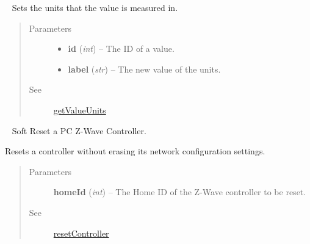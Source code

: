 \documentclass[letterpaper,10pt,english]{sphinxmanual}
\begin{document}
\begin{fulllineitems}
\begin{fulllineitems}
\begin{quote}
\begin{description}
\end{description}\end{quote}

\end{fulllineitems}


\begin{fulllineitems}
\label{libopenzwave:libopenzwave.PyManager.setValueUnits}~\label{libopenzwave:setvalueunits}
Sets the units that the value is measured in.
\begin{quote}\begin{description}
\item[{Parameters}] \leavevmode\begin{itemize}
\item {} 
\textbf{id} (\emph{int}) -- The ID of a value.

\item {} 
\textbf{label} (\emph{str}) -- The new value of the units.

\end{itemize}

\item[{See}] \leavevmode
{\hyperref[libopenzwave:getvalueunits]{getValueUnits}}

\end{description}\end{quote}

\end{fulllineitems}


\begin{fulllineitems}
\label{libopenzwave:libopenzwave.PyManager.softResetController}~\label{libopenzwave:softresetcontroller}
Soft Reset a PC Z-Wave Controller.

Resets a controller without erasing its network configuration settings.
\begin{quote}\begin{description}
\item[{Parameters}] \leavevmode
\textbf{homeId} (\emph{int}) -- The Home ID of the Z-Wave controller to be reset.

\item[{See}] \leavevmode
{\hyperref[libopenzwave:resetcontroller]{resetController}}


\end{description}
\end{quote}
\end{fulllineitems}
\end{fulllineitems}
\end{document}
